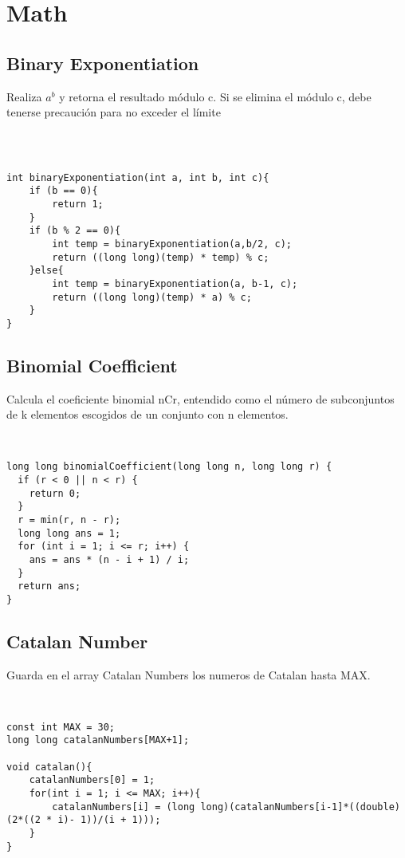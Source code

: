 \documentclass[11pt,letterpaper,twocolumn,twosided]{article}
\begin{document}
\section{Math}

\subsection{Binary Exponentiation}
Realiza $a^{b}$ y retorna el resultado m\'odulo c. Si se elimina el m\'odulo c, debe tenerse precauci\'on para no exceder el l\'imite
\begin{lstlisting}



int binaryExponentiation(int a, int b, int c){
    if (b == 0){
    	return 1;
    } 
    if (b % 2 == 0){
        int temp = binaryExponentiation(a,b/2, c);
        return ((long long)(temp) * temp) % c;
    }else{
        int temp = binaryExponentiation(a, b-1, c);
        return ((long long)(temp) * a) % c;
    }
}
\end{lstlisting}

\subsection{Binomial Coefficient}
Calcula el coeficiente binomial nCr, entendido como el n\'umero de subconjuntos de k elementos escogidos de un conjunto con n elementos.
\begin{lstlisting}


long long binomialCoefficient(long long n, long long r) {
  if (r < 0 || n < r) { 
  	return 0; 
  }
  r = min(r, n - r);
  long long ans = 1;
  for (int i = 1; i <= r; i++) {
    ans = ans * (n - i + 1) / i;
  }
  return ans;
}
\end{lstlisting}

\subsection{Catalan Number}
Guarda en el array Catalan Numbers los numeros de Catalan hasta MAX.
\begin{lstlisting}


const int MAX = 30;
long long catalanNumbers[MAX+1];

void catalan(){
	catalanNumbers[0] = 1;
	for(int i = 1; i <= MAX; i++){
		catalanNumbers[i] = (long long)(catalanNumbers[i-1]*((double)(2*((2 * i)- 1))/(i + 1)));
	}
}
\end{lstlisting}
\end{document}
